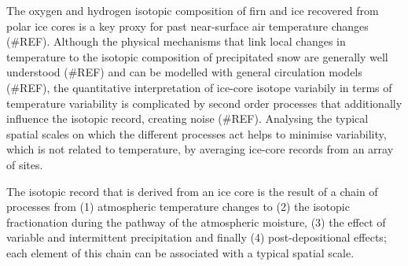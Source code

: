 \documentclass[cp, manuscript]{copernicus}
\begin{document}

\introduction

The oxygen and hydrogen isotopic composition of firn and ice recovered from
polar ice cores is a key proxy for past near-surface air temperature changes
(\#REF). Although the physical mechanisms that link local changes in temperature
to the isotopic composition of precipitated snow are generally well understood
(\#REF) and can be modelled with general circulation models (\#REF), the
quantitative interpretation of ice-core isotope variabily in terms of
temperature variability is complicated by second order processes that
additionally influence the isotopic record, creating noise (\#REF). Analysing
the typical spatial scales on which the different processes act helps to
minimise variability, which is not related to temperature, by averaging ice-core
records from an array of sites.

The isotopic record that is derived from an ice core is the result of a chain of
processes from (1) atmospheric temperature changes to (2) the isotopic
fractionation during the pathway of the atmospheric moisture, (3) the effect of
variable and intermittent precipitation and finally (4) post-depositional
effects; each element of this chain can be associated with a typical spatial
scale.
\end{document}
